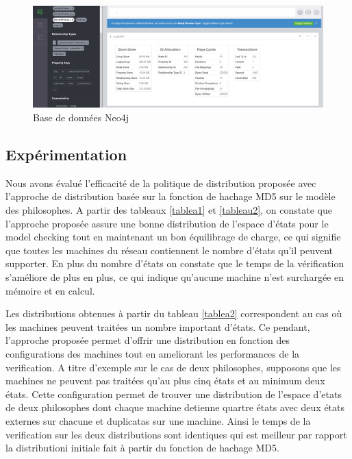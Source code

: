 \begin{figure} 
	\centering
	\includegraphics[width=1\linewidth]{img/bddneo4j}
	\caption{Base de données Neo4j} 
\end{figure}
\pagebreak
\subsection{Expérimentation}
Nous avons évalué l’efficacité de la politique de distribution proposée avec l’approche de distribution basée sur la fonction de hachage MD5 sur le modèle des philosophes. A partir des tableaux \ref{tablea1} et \ref{tableau2}, on constate que l’approche proposée assure une bonne distribution de l'espace d'états pour le model checking tout en maintenant un bon équilibrage de charge, ce qui signifie que toutes les machines du réseau contiennent le nombre d'états qu'il peuvent supporter. En plus du nombre d'états on constate que le temps de la vérification s'améliore de plus en plus, ce qui indique qu’aucune machine n’est surchargée en mémoire et en calcul.

Les distributions obtenues à partir du tableau \ref{tablea2} correspondent au cas o\`{u} les machines peuvent traitées un nombre important d'états. Ce pendant, l'approche proposée permet d'offrir une distribution en fonction des configurations des machines tout en ameliorant les performances de la verification. A titre d'exemple sur le cas de deux philosophes, supposons que les machines ne peuvent pas traitées qu'au plus cinq états et au minimum deux états. Cette configuration permet de trouver une distribution de l'espace d'etats de deux philosophes dont chaque machine detienne quartre états avec deux états externes sur chacune et duplicatas sur une machine. Ainsi le temps de la verification sur les deux distributions sont identiques qui est meilleur par rapport la distributioni initiale fait à partir du fonction de hachage MD5.


